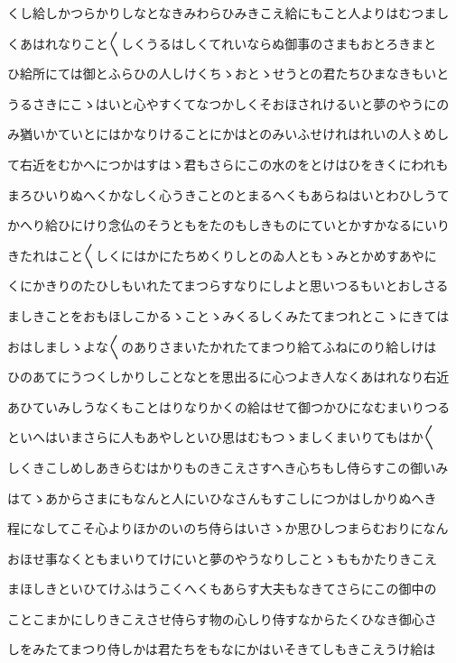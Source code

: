 \documentclass[a4paper,11pt,landscape]{ltjtarticle}
\begin{document}
くし給しかつらかりしなとなきみわらひみきこえ給にもこと人よりはむつまし
\par\medskip
くあはれなりこと〱しくうるはしくてれいならぬ御事のさまもおとろきまと
\par\medskip
ひ給所にては御とふらひの人しけくちゝおとゝせうとの君たちひまなきもいと
\par\medskip
うるさきにこゝはいと心やすくてなつかしくそおほされけるいと夢のやうにの
\par\medskip
み猶いかていとにはかなりけることにかはとのみいふせけれはれいの人〻めし
\par\medskip
て右近をむかへにつかはすはゝ君もさらにこの水のをとけはひをきくにわれも
\par\medskip
まろひいりぬへくかなしく心うきことのとまるへくもあらねはいとわひしうて
\par\medskip
かへり給ひにけり念仏のそうともをたのもしきものにていとかすかなるにいり
\par\medskip
きたれはこと〱しくにはかにたちめくりしとのゐ人ともゝみとかめすあやに
\par\medskip
くにかきりのたひしもいれたてまつらすなりにしよと思いつるもいとおしさる
\par\medskip
ましきことをおもほしこかるゝことゝみくるしくみたてまつれとこゝにきては
\par\medskip
おはしましゝよな〱のありさまいたかれたてまつり給てふねにのり給しけは
\par\medskip
ひのあてにうつくしかりしことなとを思出るに心つよき人なくあはれなり右近
\par\medskip
あひていみしうなくもことはりなりかくの給はせて御つかひになむまいりつる
\par\medskip
といへはいまさらに人もあやしといひ思はむもつゝましくまいりてもはか〱
\par\medskip
しくきこしめしあきらむはかりものきこえさすへき心ちもし侍らすこの御いみ
\par\medskip
はてゝあからさまにもなんと人にいひなさんもすこしにつかはしかりぬへき
\par\medskip
程になしてこそ心よりほかのいのち侍らはいさゝか思ひしつまらむおりになん
\par\medskip
おほせ事なくともまいりてけにいと夢のやうなりしことゝももかたりきこえ
\par\medskip
まほしきといひてけふはうこくへくもあらす大夫もなきてさらにこの御中の
\par\medskip
ことこまかにしりきこえさせ侍らす物の心しり侍すなからたくひなき御心さ
\par\medskip
しをみたてまつり侍しかは君たちをもなにかはいそきてしもきこえうけ給は
\end{document}
